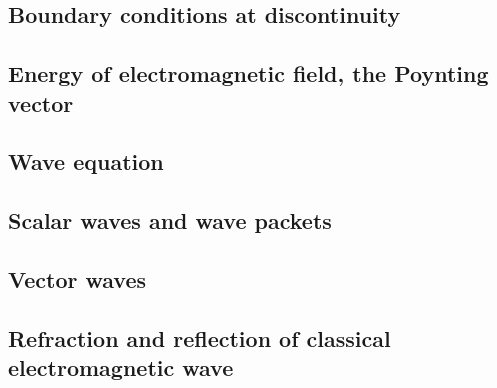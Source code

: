 \subsection{Boundary conditions at discontinuity}
\subsection{Energy of electromagnetic field, the Poynting vector}
\subsection{Wave equation}
\subsection{Scalar waves and wave packets}
\subsection{Vector waves}
\subsection{Refraction and reflection of classical electromagnetic wave}
